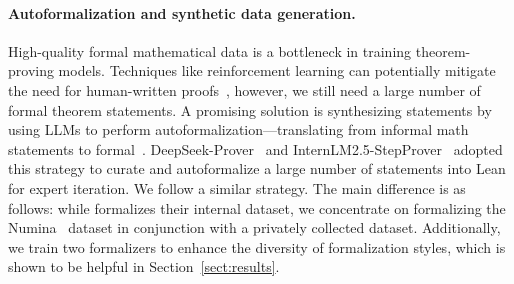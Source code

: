 \paragraph{Autoformalization and synthetic data generation.} 
High-quality formal mathematical data is a bottleneck in training theorem-proving models. Techniques like reinforcement learning can potentially mitigate the need for human-written proofs~\citep{alphaproof}, however, we still need a large number of formal theorem statements. A promising solution is synthesizing statements by using LLMs to perform autoformalization---translating from informal math statements to formal~\citep{wu2022autoformalization,wu2024internlm2,xin2024deepseek, xin2024deepseekv15}. DeepSeek-Prover~\citep{xin2024deepseek} and InternLM2.5-StepProver~\citep{wu2024internlm2} adopted this strategy to curate and autoformalize a large number of statements into Lean for expert iteration. We follow a similar strategy. The main difference is as follows: while \citet{liu2024deepseek} formalizes their internal dataset, we concentrate on formalizing the Numina~\citep{li2024numinamath} dataset in conjunction with a privately collected dataset.  Additionally, we train two formalizers to enhance the diversity of formalization styles, which is shown to be helpful in Section~\ref{sect:results}. %



